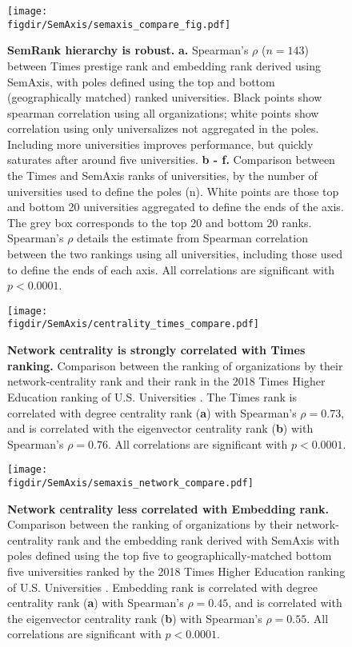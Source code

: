 \documentclass[12pt]{article} %
\def\figdir{../Figs}
\begin{document}
%
%
\begin{figure}[hp!]
	\centering
	\texttt{[image: \\figdir/SemAxis/semaxis\_compare\_fig.pdf]}
	\caption{
		\textbf{SemRank hierarchy is robust.}
		\textbf{a.} Spearman's $\rho$ ($n = 143$) between Times prestige rank and embedding rank derived using SemAxis, with poles defined using the top and bottom (geographically matched) ranked universities.
		Black points show spearman correlation using all organizations; white points show correlation using only universalizes not aggregated in the poles.
		Including more universities improves performance, but quickly saturates after around five universities.
		\textbf{b - f.} Comparison between the Times and SemAxis ranks of universities, by the number of universities used to define the poles (n).
		White points are those top and bottom 20 universities aggregated to define the ends of the axis.
		The grey box corresponds to the top 20 and bottom 20 ranks.
	  	Spearman's $\rho$ details the estimate from Spearman correlation between the two rankings using all universities, including those used to define the ends of each axis.
	  	All correlations are significant with $p < 0.0001$. 
	}
	\label{fig:supp:semaxis_compare}
\end{figure}



%
%
\begin{figure}[hp!]
	\centering
	\texttt{[image: \\figdir/SemAxis/centrality\_times\_compare.pdf]}
	\caption{
		\textbf{Network centrality is strongly correlated with Times ranking.}
		Comparison between the ranking of organizations by their network-centrality rank and their rank in the 2018 Times Higher Education ranking of U.S. Universities .
		The Times rank is correlated with degree centrality rank (\textbf{a}) with Spearman's $\rho = 0.73$, and is correlated with the eigenvector centrality rank (\textbf{b}) with Spearman's $\rho = 0.76$.
		All correlations are significant with $p < 0.0001$. 
	}
	\label{fig:supp:centrality_times_compare}
\end{figure}



%
%
\begin{figure}[hp!]
	\centering
	\texttt{[image: \\figdir/SemAxis/semaxis\_network\_compare.pdf]}
	\caption{
		\textbf{Network centrality less correlated with Embedding rank.}
		Comparison between the ranking of organizations by their network-centrality rank and the embedding rank derived with SemAxis with poles defined using the top five to geographically-matched bottom five universities ranked by the 2018 Times Higher Education ranking of U.S. Universities .
		Embedding rank is correlated with degree centrality rank (\textbf{a}) with Spearman's $\rho = 0.45$, and is correlated with the eigenvector centrality rank (\textbf{b}) with Spearman's $\rho = 0.55$.
		All correlations are significant with $p < 0.0001$. 
	}
	\label{fig:supp:centrality_semaxis_compare}
\end{figure}
\end{document}
